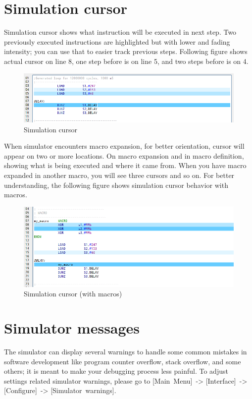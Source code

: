 \section{Simulation cursor}
    Simulation cursor shows what instruction will be executed in next step. Two previously executed instructions are highlighted but with lower and fading intensity; you can use that to easier track previous steps. Following figure shows actual cursor on line 8, one step before is on line 5, and two steps before is on 4.

    \begin{figure}[h!]
        \centering
        \includegraphics[width=\textwidth]{img/simulationcursor1.png}
        \caption{Simulation cursor}
    \end{figure}

    \clearpage

    When simulator encounters macro expansion, for better orientation, cursor will appear on two or more locations. On macro expansion and in macro definition, showing what is being executed and where it came from. When you have macro expanded in another macro, you will see three cursors and so on. For better understanding, the following figure shows simulation cursor behavior with macros.

    \begin{figure}[h!]
        \centering
        \includegraphics[width=\textwidth]{img/simulationcursor2.png}
        \caption{Simulation cursor (with macros)}
    \end{figure}


\section{Simulator messages}
    The simulator can display several warnings to handle some common mistakes in software development like program counter overflow, stack overflow, and some others; it is meant to make your debugging process less painful. To adjust settings related simulator warnings, please go to [Main~Menu]~-> [Interface]~-> [Configure]~-> [Simulator~warnings].

